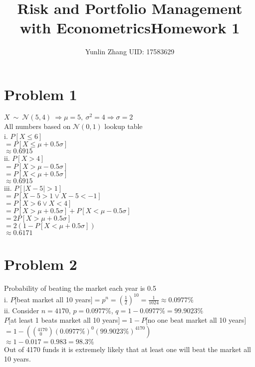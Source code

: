 \documentclass[11pt, oneside]{article}   	%
\title{Risk and Portfolio Management with Econometrics}
\title{Homework 1}
\author{Yunlin Zhang UID: 17583629}
\date{}							%
\begin{document}
\maketitle
\section{Problem 1}
$X\ \sim\ \mathcal{N}(5,4)\ \Rightarrow \mu=5,\ \sigma^2=4 \Rightarrow \sigma=2$\\
All numbers based on $\mathcal{N}(0,1)$ lookup table\\

i. $P[X\leq6]$\\
\indent$=P[X\leq \mu + 0.5\sigma]$\\
\indent$\approx0.6915$\\


ii. $P[X>4]$\\
\indent$=P[X>\mu-0.5\sigma]$\\
\indent$=P[X< \mu+0.5\sigma]$\\
\indent$\approx0.6915$\\

iii. $P[|X-5|>1]$\\
\indent$=P[X-5>1 \lor X-5<-1]$\\
\indent$=P[X>6 \lor X<4]$\\
\indent$=P[X>\mu+0.5\sigma]+P[X<\mu-0.5\sigma]$\\
\indent$=2P[X>\mu+0.5\sigma]$\\
\indent$=2(1-P[X<\mu+0.5\sigma])$\\
\indent$\approx0.6171$\\


\section{Problem 2}

Probability of beating the market each year is 0.5\\

i. $P[$beat market all 10 years$]= p^{n} = (\frac{1}{2})^{10}=\frac{1}{1024} \approx 0.0977\%$\\

ii. Consider $n=4170$, $p=0.0977\%$, $q=1-0.0977\%=99.9023\%$\\
\indent$P[$at least 1 beats market all 10 years$]=1-P[$no one beat market all 10 years$]$\\
\indent$=1-((_{\ \ 0}^{4170})(0.0977\%)^0 (99.9023\%)^{4170})$\\
\indent$\approx1-0.017=0.983=98.3\%$\\
Out of 4170 funds it is extremely likely that at least one will beat the market all 10 years.\\
\end{document}
